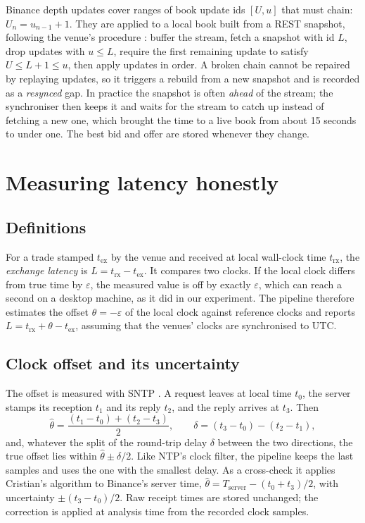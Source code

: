 \documentclass[11pt,a4paper]{article}
\begin{document}
Binance depth updates cover ranges of book update ids $[U,u]$ that must chain: $U_{n} = u_{n-1}+1$. They are
applied to a local book built from a REST snapshot, following the venue's procedure \citep{binance-ws}: buffer
the stream, fetch a snapshot with id $L$, drop updates with $u \le L$, require the first remaining update to
satisfy $U \le L+1 \le u$, then apply updates in order. A broken chain cannot be repaired by replaying
updates, so it triggers a rebuild from a new snapshot and is recorded as a \emph{resynced} gap. In practice the
snapshot is often \emph{ahead} of the stream; the synchroniser then keeps it and waits for the stream to catch
up instead of fetching a new one, which brought the time to a live book from about 15 seconds to under one.
The best bid and offer are stored whenever they change.

\section{Measuring latency honestly}\label{sec:latency}

\subsection{Definitions}

For a trade stamped $t_{\mathrm{ex}}$ by the venue and received at local wall-clock time $t_{\mathrm{rx}}$, the
\emph{exchange latency} is $L = t_{\mathrm{rx}} - t_{\mathrm{ex}}$. It compares two clocks. If the local clock
differs from true time by $\varepsilon$, the measured value is off by exactly $\varepsilon$, which can reach a
second on a desktop machine, as it did in our experiment. The pipeline therefore estimates the offset $\theta = -\varepsilon$ of the
local clock against reference clocks and reports $L = t_{\mathrm{rx}} + \theta - t_{\mathrm{ex}}$, assuming
that the venues' clocks are synchronised to UTC.

\subsection{Clock offset and its uncertainty}

The offset is measured with SNTP \citep{rfc4330,mills1991}. A request leaves at local time $t_0$, the server
stamps its reception $t_1$ and its reply $t_2$, and the reply arrives at $t_3$. Then
\[
  \hat\theta = \frac{(t_1 - t_0) + (t_2 - t_3)}{2}, \qquad \delta = (t_3 - t_0) - (t_2 - t_1),
\]
and, whatever the split of the round-trip delay $\delta$ between the two directions, the true offset lies within
$\hat\theta \pm \delta/2$. Like NTP's clock filter, the pipeline keeps the last samples and uses the one with
the smallest delay. As a cross-check it applies Cristian's algorithm \citep{cristian1989} to Binance's server
time, $\hat\theta = T_{\mathrm{server}} - (t_0+t_3)/2$, with uncertainty $\pm (t_3 - t_0)/2$. Raw receipt times
are stored unchanged; the correction is applied at analysis time from the recorded clock samples.
\end{document}
